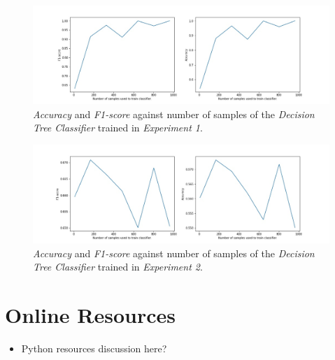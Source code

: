 \documentclass[sigplan,screen]{acmart}
\begin{document}
  \begin{figure}[h]
     \centering
     \includegraphics[width=\linewidth]{reports/figures/results_dc_1.jpg}
     \caption{\emph{Accuracy} and \emph{F1-score} against number of samples of the \emph{Decision Tree Classifier} trained in \emph{Experiment 1}.}
     \label{fig:results_dt_1}
 \end{figure}
 
  \begin{figure}[h]
     \centering
     \includegraphics[width=\linewidth]{reports/figures/results_dc_2.jpg}
     \caption{\emph{Accuracy} and \emph{F1-score} against number of samples of the \emph{Decision Tree Classifier} trained in \emph{Experiment 2}.}
     \label{fig:results_dt_2}
 \end{figure}

\section{Online Resources}

\begin{itemize}
    \item Python resources discussion here?
\end{itemize}
\end{document}
